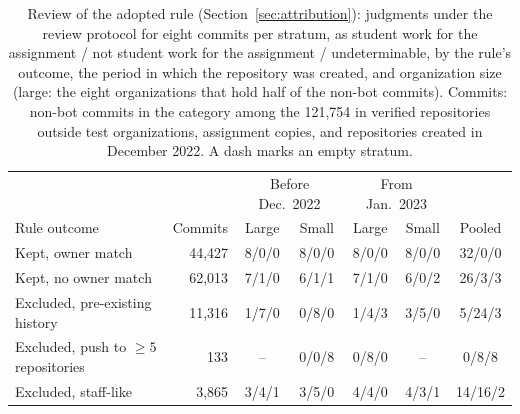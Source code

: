 \begin{table}
\caption{Review of the adopted rule (Section~\ref{sec:attribution}): judgments under the review protocol for eight commits per stratum, as student work for the assignment / not student work for the assignment / undeterminable, by the rule's outcome, the period in which the repository was created, and organization size (large: the eight organizations that hold half of the non-bot commits). Commits: non-bot commits in the category among the 121,754 in verified repositories outside test organizations, assignment copies, and repositories created in December 2022. A dash marks an empty stratum.}
\label{tab:review}
\footnotesize
\setlength{\tabcolsep}{4pt}
\begin{tabular}{@{}l r c c c c c@{}}
\toprule
 & & \multicolumn{2}{c}{Before Dec.\ 2022} & \multicolumn{2}{c}{From Jan.\ 2023} & \\
Rule outcome & Commits & Large & Small & Large & Small & Pooled \\
\midrule
Kept, owner match & 44,427 & 8/0/0 & 8/0/0 & 8/0/0 & 8/0/0 & 32/0/0 \\
Kept, no owner match & 62,013 & 7/1/0 & 6/1/1 & 7/1/0 & 6/0/2 & 26/3/3 \\
Excluded, pre-existing history & 11,316 & 1/7/0 & 0/8/0 & 1/4/3 & 3/5/0 & 5/24/3 \\
Excluded, push to $\geq 5$ repositories & 133 & -- & 0/0/8 & 0/8/0 & -- & 0/8/8 \\
Excluded, staff-like & 3,865 & 3/4/1 & 3/5/0 & 4/4/0 & 4/3/1 & 14/16/2 \\
\bottomrule
\end{tabular}
\end{table}
